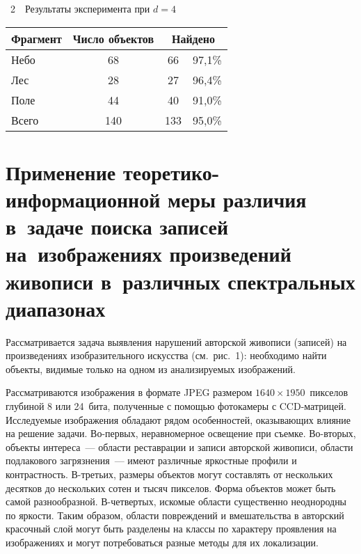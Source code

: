 \begin{multicols}{2}
\begin{center} %
{{\tablename~2}\ \ \small{Результаты эксперимента при $d = 4$}}
\vspace*{9pt}

{\small 
\begin{tabular}{|l|c|c|c|}
\hline
\multicolumn{1}{|c|}{Фрагмент}&Число объектов&\multicolumn{2}{c|}{Найдено}\\
\hline
Небо&68&66&97,1\%\\
Лес&28&27&96,4\%\\
Поле&44&40&91,0\%\\
\hline
Всего&140\hphantom{9}&133\hphantom{9}&95,0\%\\
\hline
\end{tabular}

}

\end{center}

\addtocounter{table}{1}


\noindent

      
\section{Применение теоретико-информационной меры различия в~задаче 
поиска записей на~изображениях произведений живописи в~различных 
спектральных диапазонах}
  
  Рассматривается задача выявления нарушений авторской живописи (записей) на 
произведениях изобразительного искусства (см.\ рис.~1): необходимо найти объекты, 
видимые только на одном из анализируемых изображений.
  
  Рассматриваются изображения в формате JPEG размером $1640\times 1950$~пикселов 
глубиной 8 или 24~бита, полученные с помощью фотокамеры с CCD-матрицей. 
Исследуемые изображения обладают рядом особенностей, оказывающих влияние на 
решение задачи. Во-пер\-вых, неравномерное освещение при съемке. Во-вто\-рых, объекты 
интереса~--- области реставрации и записи авторской живописи, области подлакового 
загрязнения~--- имеют различные яркостные профили и контрастность. В-третьих, размеры 
объектов могут составлять от нескольких десятков до нескольких сотен и тысяч пикселов. 
Форма объектов может быть самой разнообразной. В-чет\-вер\-тых, искомые области 
существенно неоднородны по яркости. Таким образом, области повреждений и 
вмешательства в авторский красочный слой могут быть разделены на классы по характеру 
проявления на изображениях и могут потребоваться разные методы для их локализации.
  

\end{multicols}
